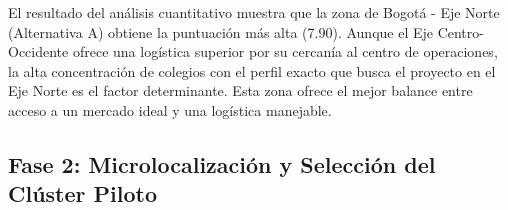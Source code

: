 \begin{table}[htbp!]
  \centering
  \caption{Matriz de Evaluación de Macrolocalización por Zonas de Influencia.}
  \label{tab:macro_zonas}
\end{table}

El resultado del análisis cuantitativo muestra que la zona de Bogotá - Eje Norte
(Alternativa A) obtiene la puntuación más alta (7.90). Aunque el Eje
Centro-Occidente ofrece una logística superior por su cercanía al centro de
operaciones, la alta concentración de colegios con el perfil exacto que busca el
proyecto en el Eje Norte es el factor determinante. Esta zona ofrece el mejor
balance entre acceso a un mercado ideal y una logística manejable.

\subsection{Fase 2: Microlocalización y Selección del Clúster Piloto}

